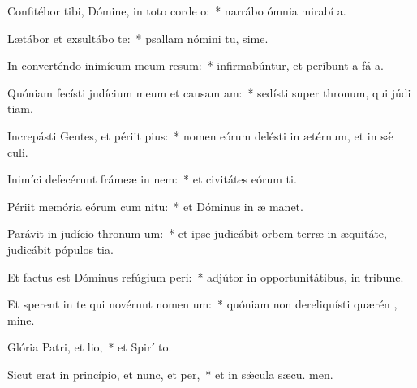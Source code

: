 \item Confitébor tibi, Dómine, in toto corde o:~* narrábo ómnia mirabí a.
\item Lætábor et exsultábo  te:~* psallam nómini tu, sime.
\item In converténdo inimícum meum resum:~* infirmabúntur, et períbunt a fá a.
\item Quóniam fecísti judícium meum et causam am:~* sedísti super thronum, qui júdi tiam.
\item Increpásti Gentes, et périit pius:~* nomen eórum delésti in ætérnum, et in sǽ culi.
\item Inimíci defecérunt frámeæ in nem:~* et civitátes eórum ti.
\item Périit memória eórum cum nitu:~* et Dóminus in æ manet.
\item Parávit in judício thronum um:~* et ipse judicábit orbem terræ in æquitáte, judicábit pópulos  tia.
\item Et factus est Dóminus refúgium peri:~* adjútor in opportunitátibus, in tribune.
\item Et sperent in te qui novérunt nomen um:~* quóniam non dereliquísti quærén , mine.
\item Glória Patri, et lio,~* et Spirí to.
\item Sicut erat in princípio, et nunc, et per,~* et in sǽcula sæcu. men.
